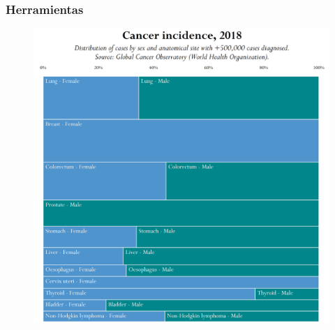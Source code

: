 \documentclass{beamer}
\begin{document}

\begin{frame}\frametitle{Herramientas}
	\vspace{-5pt}
	\begin{figure}
		\centering
		\includegraphics[width=.68\textwidth]{images/26.png}
	\end{figure}	
\end{frame}

\end{document}
